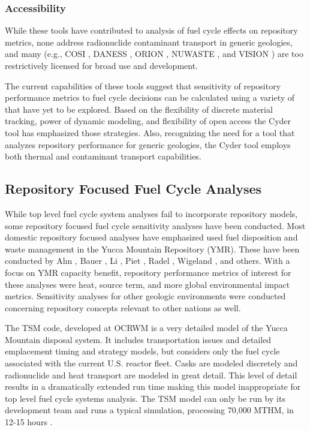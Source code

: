 \subsubsection{Accessibility}

While these tools have contributed to analysis of fuel cycle effects on 
repository metrics, none address radionuclide contaminant transport in generic 
geologies, and many (e.g.,
\gls{COSI} \cite{boucher_international_2010},
\gls{DANESS} \cite{yacout_daness_2011,van_den_durpel_daness:_2006}, 
ORION \cite{gregg_orion_2011},
\gls{NUWASTE} \cite{abkowitz_nuclear_2010}, and
\gls{VISION} \cite{yacout_vision_2006, wilson_comparing_2011, radel_repository_2007, boucher_international_2010}
) are too restrictively licensed for broad use and development. 


The current capabilities of these tools suggest that sensitivity of repository 
performance metrics to fuel cycle decisions can be calculated using a variety of 
that have yet to be explored. Based on the flexibility of discrete material 
tracking, power of dynamic modeling, and flexibility of open access the Cyder 
tool has emphasized those strategies. Also, recognizing the need for a tool 
that analyzes repository performance for generic geologies, the Cyder tool 
employs both thermal and contaminant transport capabilities.

\subsection{Repository Focused Fuel Cycle Analyses}

While top level fuel cycle system analyses fail to incorporate repository 
models, some repository focused fuel cycle sensitivity analyses have been conducted. 
Most domestic repository focused analyses have emphasized used fuel disposition and
waste management in the Yucca Mountain Repository (YMR). These have been conducted by
Ahn \cite{ahn_environmental_2007}, 
Bauer \cite{bauer_geologic_2007}, 
Li \cite{li_examining_2007}, 
Piet \cite{piet_which_2007}, 
Radel \cite{radel_determination_2007}, 
Wigeland \cite{wigeland_criteria_2006,wigeland_separations_2006}, 
and others. With a focus on YMR capacity benefit, 
repository performance metrics of interest for these analyses were heat, source 
term, and more global environmental impact metrics.  Sensitivity analyses for 
other geologic environments were conducted concerning repository concepts relevant to other
nations as well. 

The \gls{TSM} code, 
developed at \gls{OCRWM} is a very detailed model of the Yucca Mountain disposal 
system. It includes transportation issues and detailed emplacement timing and 
strategy models, but considers only the fuel cycle associated with the current  
U.S.  reactor fleet. Casks are modeled discretely and radionuclide and heat transport 
are modeled in great detail.  This level of detail results in a dramatically extended
run time making this model inappropriate for top level fuel cycle systems analysis. 
The \gls{TSM} model can only be run by its development team and runs a typical 
simulation, processing 70,000 MTHM, in 12-15 hours \cite{turner_discrete_2010}. 

